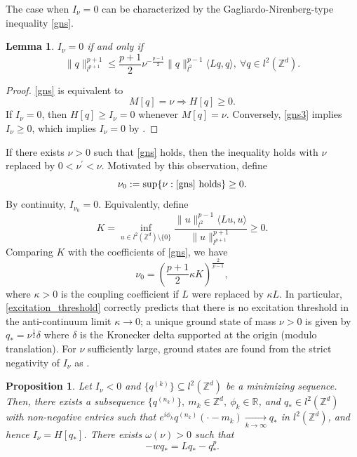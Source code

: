 \documentclass{article}
\numberwithin{equation}{section}
\newtheorem{lemma}{Lemma}[section]
\newtheorem{proposition}{Proposition}[section]
\begin{document}
The case when $I_\nu = 0$ can be characterized by the Gagliardo-Nirenberg-type inequality \eqref{gns}.
\begin{lemma}\label{l4}
    $I_\nu = 0$ if and only if
    \begin{equation}\label{gns}
        \| q \|_{l^{p+1}}^{p+1} \leq \frac{p+1}{2} \nu^{-\frac{p-1}{2}} \| q \|_{l^2}^{p-1} \langle Lq,q \rangle,\ \forall q \in l^2(\mathbb{Z}^d).    
    \end{equation}
\end{lemma}
\begin{proof}
    \eqref{gns} is equivalent to
    \begin{equation}\label{gns3}
        M[q] = \nu \Rightarrow H[q] \geq 0.
    \end{equation}
    If $I_\nu = 0$, then $H[q] \geq I_\nu = 0$ whenever $M[q] = \nu$. Conversely, \eqref{gns3} implies $I_\nu \geq 0$, which implies $I_\nu = 0$ by .
\end{proof}
If there exists $\nu > 0$ such that \eqref{gns} holds, then the inequality holds with $\nu$ replaced by $0 < \nu^\prime < \nu$. Motivated by this observation, define
    \begin{equation}\label{def:excite}
        \nu_0 := \sup \{\nu: \eqref{gns} \text{\ holds}\} \geq 0.
    \end{equation}
By continuity, $I_{\nu_0} = 0$. Equivalently, define 
\begin{equation}\label{gns5}
    K = \inf_{u \in l^2(\mathbb{Z}^d) \setminus \{0\} } \frac{\| u \|_{l^2}^{p-1} \langle Lu,u \rangle}{\| u \|_{l^{p+1}}^{p+1}} \geq 0.
\end{equation}
Comparing $K$ with the coefficients of \eqref{gns}, we have
\begin{equation}\label{excitation_threshold}
\nu_0 = \left(\frac{p+1}{2}\kappa K\right)^{\frac{2}{p-1}},    
\end{equation}
where $\kappa >0$ is the coupling coefficient if $L$ were replaced by $\kappa L$. In particular, \eqref{excitation_threshold} correctly predicts that there is no excitation threshold in the anti-continuum limit $\kappa \rightarrow 0$; a unique ground state of mass $\nu > 0$ is given by $q_* = \nu^{\frac{1}{2}}\delta$ where $\delta$ is the Kronecker delta supported at the origin (modulo translation). For $\nu$ sufficiently large, ground states are found from the strict negativity of $I_\nu$ as \cite[Theorem 2.1]{weinstein1999excitation}.
\begin{proposition}\label{l2}
    Let $I_\nu < 0$ and $\{q^{(k)}\} \subseteq l^2(\mathbb{Z}^d)$ be a minimizing sequence. Then, there exists a subsequence $\{q^{(n_k)}\},\ m_k \in \mathbb{Z}^d,\ \phi_k \in \mathbb{R}$, and $q_* \in l^2(\mathbb{Z}^d)$ with non-negative entries such that $e^{i \phi_k} q^{(n_k)}(\cdot - m_k) \xrightarrow[k \rightarrow \infty]{} q_*$ in $l^2(\mathbb{Z}^d)$, and hence $I_\nu = H[q_*]$. There exists $\omega(\nu) > 0$ such that
    \begin{equation}\label{main_model3}
        -w q_* = L q_* - q_*^p.
    \end{equation}
\end{proposition}
\end{document}
